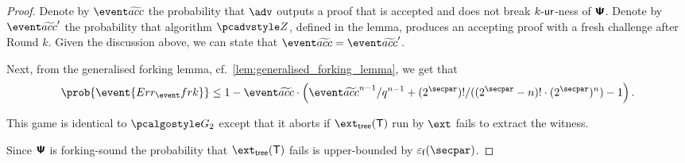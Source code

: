 \documentclass[runningheads,11pt]{llncs}
\begin{document}
\begin{proof}
Denote by $\waccProb$ the probability that $\advse$ outputs a proof that is
accepted and does not break ${k\text{-}\mathsf{ur}}$-ness of $\bm{\mathsf{\Psi}}$.  Denote by $\waccProb'$ the
probability that algorithm $\zdv$, defined in the lemma, produces an accepting
proof with a fresh challenge after Round $k$. Given the discussion above, we can
state that $\waccProb = \waccProb'$.

Next, from the generalised forking lemma, cf.~\cref{lem:generalised_forking_lemma}, we get that
\begin{equation}
  \begin{split}
    \prob{\event{\errfrk}} \leq 1 - \waccProb \cdot \left(\infrac{\waccProb^{n -
          1}}{q^{n - 1}} + \infrac{(2^\secpar) !}{((2^\secpar - n)! \cdot
        (2^\secpar)^{n})} - 1\right).
\end{split}
\end{equation}



 This game is identical to $\game{2}$ except that it aborts if
$\extt(\tree)$ run by $\ext$ fails to extract the witness. 

Since $\bm{\mathsf{\Psi}}$ is forking-sound the probability that $\extt(\tree)$
fails is upper-bounded by $\epsss(\secpar)$. 


\end{proof}
\end{document}
